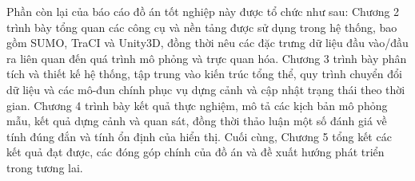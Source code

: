 \documentclass[../DoAn.tex]{subfiles}
\begin{document}




Phần còn lại của báo cáo đồ án tốt nghiệp này được tổ chức như sau: Chương 2 trình bày tổng quan các công cụ và nền tảng được sử dụng trong hệ thống, bao gồm SUMO, TraCI và Unity3D, đồng thời nêu các đặc trưng dữ liệu đầu vào/đầu ra liên quan đến quá trình mô phỏng và trực quan hóa. Chương 3 trình bày phân tích và thiết kế hệ thống, tập trung vào kiến trúc tổng thể, quy trình chuyển đổi dữ liệu và các mô-đun chính phục vụ dựng cảnh và cập nhật trạng thái theo thời gian. Chương 4 trình bày kết quả thực nghiệm, mô tả các kịch bản mô phỏng mẫu, kết quả dựng cảnh và quan sát, đồng thời thảo luận một số đánh giá về tính đúng đắn và tính ổn định của hiển thị. Cuối cùng, Chương 5 tổng kết các kết quả đạt được, các đóng góp chính của đồ án và đề xuất hướng phát triển trong tương lai.
\end{document}
